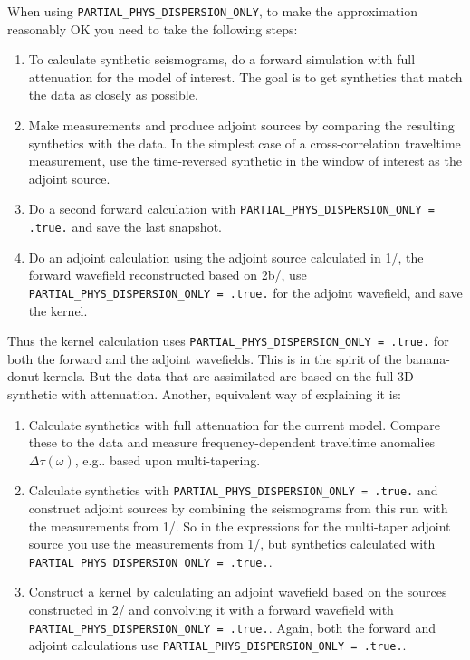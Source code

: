 \begin{description}
When using \texttt{PARTIAL\_PHYS\_DISPERSION\_ONLY}, to make the approximation reasonably OK you need to take the following steps:
\begin{enumerate}
\item[1/] To calculate synthetic seismograms, do a forward simulation with full attenuation for the model of interest. The goal is to get synthetics that match the data as closely as possible.
\item[2a/] Make measurements and produce adjoint sources by comparing the resulting synthetics with the data. In the simplest case of a cross-correlation traveltime measurement, use the time-reversed synthetic in the window of interest as the adjoint source.
\item[2b/] Do a second forward calculation with \texttt{PARTIAL\_PHYS\_DISPERSION\_ONLY = .true.} and save the last snapshot.
\item[3/] Do an adjoint calculation using the adjoint source calculated in 1/, the forward wavefield reconstructed based on 2b/, use \texttt{PARTIAL\_PHYS\_DISPERSION\_ONLY = .true.} for the adjoint wavefield, and save the kernel.
\end{enumerate}
Thus the kernel calculation uses \texttt{PARTIAL\_PHYS\_DISPERSION\_ONLY = .true.} for both the forward and the adjoint wavefields. This is in the spirit of the banana-donut kernels. But the data that are assimilated are based on the full 3D synthetic with attenuation.\newline
%
Another, equivalent way of explaining it is:
\begin{enumerate}
\item[1/] Calculate synthetics with full attenuation for the current model. Compare these to the data and measure frequency-dependent traveltime anomalies $\Delta \tau(\omega)$, e.g.. based upon multi-tapering.
\item[2/] Calculate synthetics with \texttt{PARTIAL\_PHYS\_DISPERSION\_ONLY = .true.} and construct adjoint sources by combining the seismograms from this run with the measurements from 1/. So in the expressions for the multi-taper adjoint source you use the measurements from 1/, but synthetics calculated with \texttt{PARTIAL\_PHYS\_DISPERSION\_ONLY = .true.}.
\item[3/] Construct a kernel by calculating an adjoint wavefield based on the sources constructed in 2/ and convolving it with a forward wavefield with \texttt{PARTIAL\_PHYS\_DISPERSION\_ONLY = .true.}. Again, both the forward and adjoint calculations use \texttt{PARTIAL\_PHYS\_DISPERSION\_ONLY = .true.}.

\end{enumerate}
\end{description}
